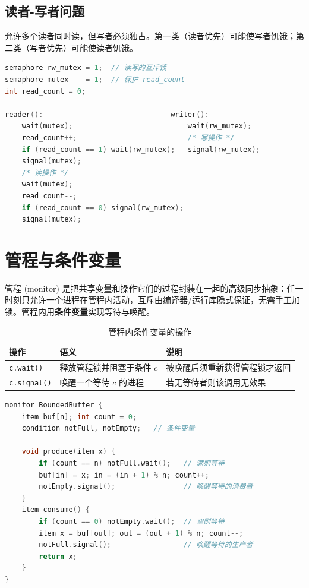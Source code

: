 \subsection{读者-写者问题}

允许多个读者同时读，但写者必须独占。第一类（读者优先）可能使写者饥饿；第二类（写者优先）可能使读者饥饿。

\begin{lstlisting}[language=C, caption={读者-写者（读者优先）}]
semaphore rw_mutex = 1;  // 读写的互斥锁
semaphore mutex    = 1;  // 保护 read_count
int read_count = 0;

reader():                              writer():
    wait(mutex);                           wait(rw_mutex);
    read_count++;                          /* 写操作 */
    if (read_count == 1) wait(rw_mutex);   signal(rw_mutex);
    signal(mutex);
    /* 读操作 */
    wait(mutex);
    read_count--;
    if (read_count == 0) signal(rw_mutex);
    signal(mutex);
\end{lstlisting}

\section{管程与条件变量}

管程 (monitor) 是把共享变量和操作它们的过程封装在一起的高级同步抽象：任一时刻只允许一个进程在管程内活动，互斥由编译器/运行库隐式保证，无需手工加锁。管程内用\textbf{条件变量}实现等待与唤醒。

\begin{table}[H]
\centering
\caption{管程内条件变量的操作}
\begin{tabulary}{\textwidth}{LLL}
\toprule
操作 & 语义 & 说明 \\
\midrule
\texttt{c.wait()} & 释放管程锁并阻塞于条件 $c$ & 被唤醒后须重新获得管程锁才返回 \\
\texttt{c.signal()} & 唤醒一个等待 $c$ 的进程 & 若无等待者则该调用无效果 \\
\bottomrule
\end{tabulary}
\end{table}

\begin{lstlisting}[language=C, caption={管程实现生产者-消费者}]
monitor BoundedBuffer {
    item buf[n]; int count = 0;
    condition notFull, notEmpty;   // 条件变量

    void produce(item x) {
        if (count == n) notFull.wait();   // 满则等待
        buf[in] = x; in = (in + 1) % n; count++;
        notEmpty.signal();                // 唤醒等待的消费者
    }
    item consume() {
        if (count == 0) notEmpty.wait();  // 空则等待
        item x = buf[out]; out = (out + 1) % n; count--;
        notFull.signal();                 // 唤醒等待的生产者
        return x;
    }
}
\end{lstlisting}

